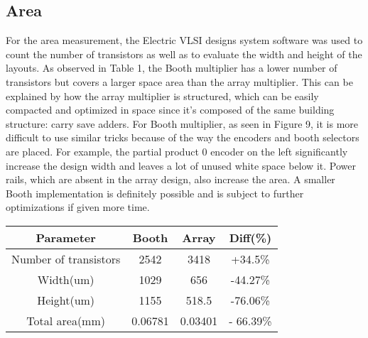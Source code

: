 \documentclass[conference]{IEEEtran}
\begin{document}
\subsection{Area}
For the area measurement, the Electric VLSI designs system software was used to count the number of transistors as well as to evaluate the width and height of the layouts. As observed in Table 1, the Booth multiplier has a lower number of transistors but covers a larger space area than the array multiplier. This can be explained by how the array multiplier is structured, which can be easily compacted and optimized in space since it's composed of the same building structure: carry save adders. For Booth multiplier, as seen in Figure 9, it is more difficult to use similar tricks because of the way the encoders and booth selectors are placed. For example, the partial product 0 encoder on the left significantly increase the design width and leaves a lot of unused white space below it. Power rails, which are absent in the array design, also increase the area. A smaller Booth implementation is definitely possible and is subject to further optimizations if given more time.

\begin{table}[!htb]
\renewcommand{\arraystretch}{1.3}
\centering
\begin{tabular}{|c|c|c|c|}
\hline
Parameter​ & Booth & Array & Diff(\%) \\
\hline
Number of transistors​ & 2542 & 3418 & +34.5​\% \\
\hline
Width(um)​ & 1029 & 656 & -44.27​\% \\
\hline
Height(um) & 1155 & 518.5 & -76.06​\% \\
\hline
Total area(mm)​ & 0.06781​ & 0.03401 & - 66.39\%​ \\
\hline
\end{tabular}
\end{table}
\end{document}
